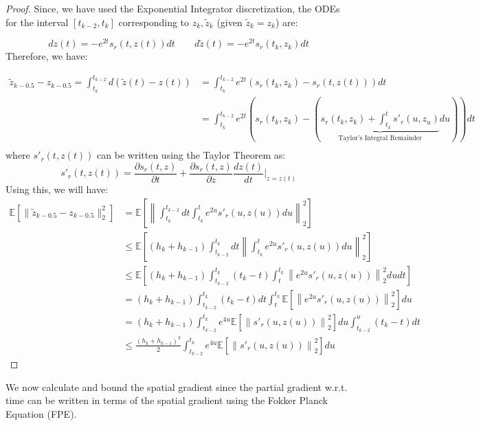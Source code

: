 \documentclass{article}
\begin{document}
\begin{proof}
    Since, we have used the Exponential Integrator discretization, the ODEs for the interval $[t_{k-2},t_k]$ corresponding to $z_k, \tilde{z}_k$ (given $\tilde{z}_k=z_k$) are:

\[
dz(t) = - e^{2t}s_r(t,z(t))dt \qquad d\tilde{z}(t) = -e^{2t}s_r(t_k,z_k)dt
\]
Therefore, we have:

\begin{align*}
     \tilde{z}_{k-0.5} - {z}_{k-0.5} = \int^{t_{k-2}}_{t_k}d(\tilde{z}(t) - z(t)) & =  
 \int_{t_{k}}^{t_{k-2}} e^{2t}\left(s_r(t_{k},z_k) - s_r(t,z(t))\right)dt \\
 &= 
 \int_{t_{k}}^{t_{k-2}}  {e^{2t}\left(s_r(t_{k},z_{{k}}) - \left(\underbrace{s_r(t_k,z_{k}) + \int^t_{t_k}s'_r(u,z_u)}_{\text{Taylor's Integral Remainder}}du \right)\right)dt } \\ 
\end{align*}
where $s'_r(t,z(t))$ can be written using the Taylor Theorem as:
\[
s'_r(t,z(t))= {\frac{\partial s_r(t,z)}{\partial t}}
+ {{\frac{\partial s_r(t,z)}{\partial z}} {\frac{d z(t)}{d t}} \Big|_{z=z(t)}}
\]
Using this, we will have:
\begin{align*}
\mathbb{E}[\|\tilde{z}_{k-0.5}-z_{k-0.5}\|_2^2] &= \mathbb{E}\left[\left\|\int_{t_k}^{t_{k-2}}dt\int_{t_k}^te^{2u}s'_r(u,z(u))du \right\|_2^2 \right] \\
&\leq \mathbb{E}\left[(h_k+h_{k-1})\int_{t_{k-2}}^{t_k}dt\left\|\int_{t_k}^te^{2u}s'_r(u,z(u))  du\right\|_2^2\right] \\
&\leq \mathbb{E}\left[(h_k+h_{k-1})\int_{t_{k-2}}^{t_k}(t_k-t)\int_{t}^{t_k}\left\|e^{2u}s'_r(u,z(u))  \right\|_2^2dudt\right] \\
        &= (h_k+h_{k-1})\int_{t_{k-2}}^{t_k}(t_k-t)dt\int_{t}^{t_k}\mathbb{E}\left[\left\|e^{2u}s'_r(u,z(u)) \right\|_2^2\right] du \\
        &= (h_k+h_{k-1})\int_{t_{k-2}}^{t_k}e^{4u}\mathbb{E}\left[\left\|s'_r(u,z(u)) \right\|_2^2\right] du\int_{t_{k-2}}^{u}(t_k-t) dt\\
        &\leq \frac{(h_k+h_{k-1})^3}{2}  \int_{t_{k-2}}^{t_k}e^{4u}\mathbb{E}\left[\left\|s'_r(u,z(u)) \right\|_2^2\right]du 
\end{align*}
\end{proof}


\noindent
We now calculate and bound the spatial gradient since the partial gradient w.r.t. time can be written in terms of the spatial gradient using the Fokker Planck Equation (FPE).
\end{document}
